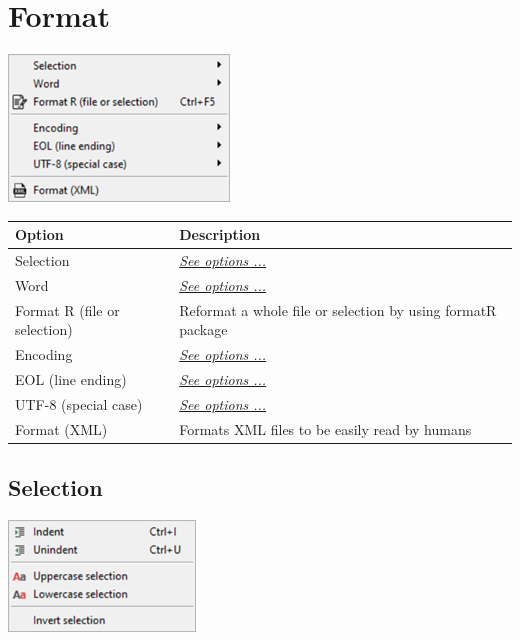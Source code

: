 
\hypertarget{menu_format}{}
\section{Format}

\includegraphics[scale=0.8]{./res/menu_format.png}\\

\begin{scriptsize}
  \begin{tabularx}{\textwidth}{>{\hsize=0.3\hsize}X>{\hsize=0.7\hsize}X}\\
    \hline
    \textbf{Option} & \textbf{Description} \\
    \hline
    Selection & \textit{\href{\#menu\_format\_selection}{See options ...}} \\
    Word & \textit{\href{\#menu\_format\_word}{See options ...}} \\
    Format R (file or selection) & Reformat a whole file or selection by using formatR package \\
    \hdashline[1pt/1pt]
    Encoding & \textit{\href{\#menu\_format\_encoding}{See options ...}} \\
    EOL (line ending) & \textit{\href{\#menu\_format\_eol}{See options ...}} \\
    UTF-8 (special case) & \textit{\href{\#menu\_format\_utf8}{See options ...}} \\
    \hdashline[1pt/1pt]
    Format (XML) & Formats XML files to be easily read by humans \\
    \hline
  \end{tabularx}
\end{scriptsize}


\hypertarget{menu_format_selection}{}
\subsection{Selection}

\includegraphics[scale=0.8]{./res/menu_format_selection.png}\\


